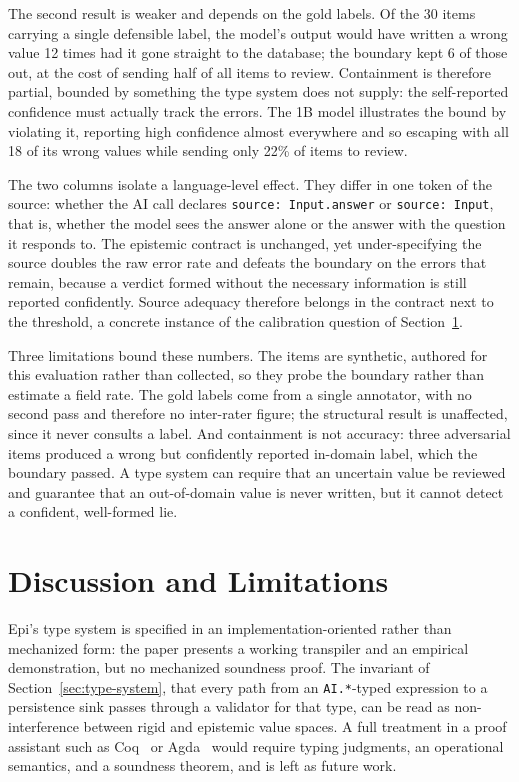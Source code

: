 \documentclass[sigconf]{acmart}
\begin{document}
The second result is weaker and depends on the gold labels. Of the 30 items carrying a single defensible label, the model's output would have written a wrong value 12 times had it gone straight to the database; the boundary kept 6 of those out, at the cost of sending half of all items to review. Containment is therefore partial, bounded by something the type system does not supply: the self-reported confidence must actually track the errors. The 1B model illustrates the bound by violating it, reporting high confidence almost everywhere and so escaping with all 18 of its wrong values while sending only 22\% of items to review.

The two columns isolate a language-level effect. They differ in one token of the source: whether the AI call declares \texttt{source:\ Input.answer} or \texttt{source:\ Input}, that is, whether the model sees the answer alone or the answer with the question it responds to. The epistemic contract is unchanged, yet under-specifying the source doubles the raw error rate and defeats the boundary on the errors that remain, because a verdict formed without the necessary information is still reported confidently. Source adequacy therefore belongs in the contract next to the threshold, a concrete instance of the calibration question of Section~\ref{sec:discussion}.

Three limitations bound these numbers. The items are synthetic, authored for this evaluation rather than collected, so they probe the boundary rather than estimate a field rate. The gold labels come from a single annotator, with no second pass and therefore no inter-rater figure; the structural result is unaffected, since it never consults a label. And containment is not accuracy: three adversarial items produced a wrong but confidently reported in-domain label, which the boundary passed. A type system can require that an uncertain value be reviewed and guarantee that an out-of-domain value is never written, but it cannot detect a confident, well-formed lie.

\section{Discussion and Limitations}
\label{sec:discussion}

Epi's type system is specified in an implementation-oriented rather than mechanized form: the paper presents a working transpiler and an empirical demonstration, but no mechanized soundness proof. The invariant of Section~\ref{sec:type-system}, that every path from an \texttt{AI.*}-typed expression to a persistence sink passes through a validator for that type, can be read as non-interference between rigid and epistemic value spaces. A full treatment in a proof assistant such as Coq~\cite{bertot2004} or Agda~\cite{norell2009} would require typing judgments, an operational semantics, and a soundness theorem, and is left as future work.
\end{document}
